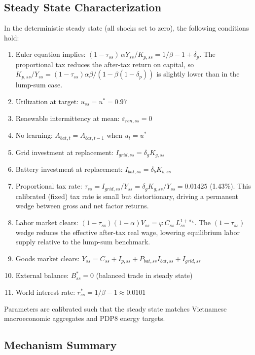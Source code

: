 \documentclass[12pt, a4paper]{article}
\begin{document}
	\subsection{Steady State Characterization}
	
	In the deterministic steady state (all shocks set to zero), the following conditions hold:
	
	\begin{enumerate}
		\item Euler equation implies: $(1-\tau_{ss})\,\alpha Y_{ss}/K_{p,ss} = 1/\beta - 1 + \delta_p$. The proportional tax reduces the after-tax return on capital, so $K_{p,ss}/Y_{ss} = (1-\tau_{ss})\alpha\beta/(1-\beta(1-\delta_p))$ is slightly lower than in the lump-sum case.
		\item Utilization at target: $u_{ss} = u^* = 0.97$
		\item Renewable intermittency at mean: $\varepsilon_{ren,ss} = 0$
		\item No learning: $A_{bat,t} = A_{bat,t-1}$ when $u_t = u^*$
		\item Grid investment at replacement: $I_{grid,ss} = \delta_g K_{g,ss}$
		\item Battery investment at replacement: $I_{bat,ss} = \delta_b K_{b,ss}$
		\item Proportional tax rate: $\tau_{ss} = I_{grid,ss}/Y_{ss} = \delta_g K_{g,ss}/Y_{ss} = 0.01425$ (1.43\%). This calibrated (fixed) tax rate is small but distortionary, driving a permanent wedge between gross and net factor returns.
		\item Labor market clears: $(1-\tau_{ss})(1-\alpha)V_{ss} = \varphi \, C_{ss} \, L_{ss}^{1+\sigma_L}$. The $(1-\tau_{ss})$ wedge reduces the effective after-tax real wage, lowering equilibrium labor supply relative to the lump-sum benchmark.
		\item Goods market clears: $Y_{ss} = C_{ss} + I_{p,ss} + P_{bat,ss} I_{bat,ss} + I_{grid,ss}$
		\item External balance: $B^*_{ss} = 0$ (balanced trade in steady state)
		\item World interest rate: $r^*_{ss} = 1/\beta - 1 \approx 0.0101$
	\end{enumerate}
	
	Parameters are calibrated such that the steady state matches Vietnamese macroeconomic aggregates and PDP8 energy targets.
	
	\subsection{Mechanism Summary}
	
\end{document}
